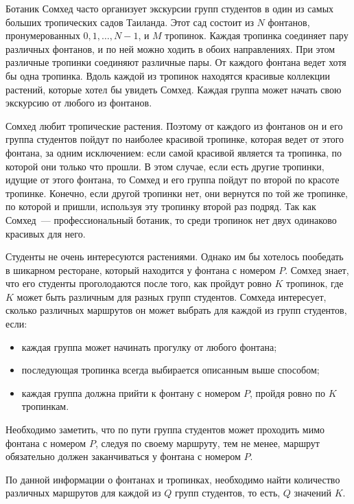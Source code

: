 Ботаник Сомхед часто организует экскурсии групп студентов в один из самых больших тропических садов Таиланда. Этот сад состоит из $N$ фонтанов, пронумерованных $0, 1, \ldots, N-1$, и $M$ тропинок. Каждая тропинка соединяет пару различных фонтанов, и по ней можно ходить в обоих направлениях. При этом различные тропинки соединяют различные пары. От каждого фонтана ведет хотя бы одна тропинка. Вдоль каждой из тропинок находятся красивые коллекции растений, которые хотел бы увидеть Сомхед. Каждая группа может начать свою экскурсию от любого из фонтанов.

Сомхед любит тропические растения. Поэтому от каждого из фонтанов он и его группа студентов пойдут по наиболее красивой тропинке, которая ведет от этого фонтана, за одним исключением: если самой красивой является та тропинка, по которой они только что прошли. В этом случае, если есть другие тропинки, идущие от этого фонтана, то Сомхед и его группа пойдут по второй по красоте тропинке. Конечно, если другой тропинки нет, они вернутся по той же тропинке, по которой и пришли, используя эту тропинку второй раз подряд. Так как Сомхед~--- профессиональный ботаник, то среди тропинок нет двух одинаково красивых для него.

Студенты не очень интересуются растениями. Однако им бы хотелось пообедать в шикарном ресторане, который находится у фонтана с номером $P$. Сомхед знает, что его студенты проголодаются после того, как пройдут ровно $K$ тропинок, где $K$ может быть различным для разных групп студентов. Сомхеда интересует, сколько различных маршрутов он может выбрать для каждой из групп студентов, если:

\begin{itemize}
\item каждая группа может начинать прогулку от любого фонтана; 
\item последующая тропинка всегда выбирается описанным выше способом; 
\item каждая группа должна прийти к фонтану с номером $P$, пройдя ровно по $K$ тропинкам.
\end{itemize}

Необходимо заметить, что по пути группа студентов может проходить мимо фонтана с номером $P$, следуя по своему маршруту, тем не менее, маршрут обязательно должен заканчиваться у фонтана с номером $P$.

По данной информации о фонтанах и тропинках, необходимо найти количество различных маршрутов для каждой из $Q$ групп студентов, то есть, $Q$ значений $K$.

